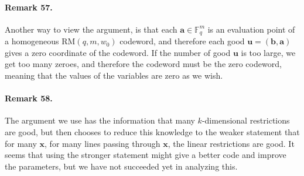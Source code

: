 \documentclass[10pt,a4paper]{article}
\begin{document}
\paragraph{Remark 57.} Another way to view the argument, is that each $\boldsymbol a\in\mathbb F_q^m$ is an evaluation point of a homogeneous $\mathrm{RM}(q,m,w_0)$ codeword, and therefore each good $\boldsymbol u=(\boldsymbol b,\boldsymbol a)$ gives a zero coordinate of the codeword. If the number of good $\boldsymbol u$ is too large, we get too many zeroes, and therefore the codeword must be the zero codeword, meaning that the values of the variables are zero as we wish.
\paragraph{Remark 58.} The argument we use has the information that many $k$-dimensional restrictions are good, but then chooses to reduce this knowledge to the weaker statement that for many $\boldsymbol x$, for many lines passing through $\boldsymbol x$, the linear restrictions are good. It seems that using the stronger statement might give a better code and improve the parameters, but we have not succeeded yet in analyzing this.
\end{document}
